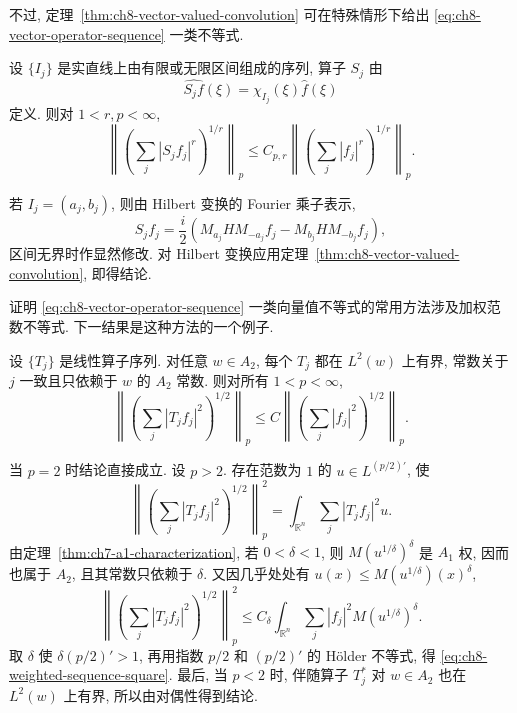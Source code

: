 不过, 定理~\ref{thm:ch8-vector-valued-convolution} 可在特殊情形下给出 \eqref{eq:ch8-vector-operator-sequence} 一类不等式.

\begin{Corollary}
\label{cor:ch8-interval-projections-vector-valued}
设 $\{I_j\}$ 是实直线上由有限或无限区间组成的序列, 算子 $S_j$ 由
\[
 \widehat{S_jf}(\xi)=\chi_{I_j}(\xi)\widehat f(\xi)
\]
定义. 则对 $1<r,p<\infty$,
\[
 \left\|\left(\sum_j|S_jf_j|^r\right)^{1/r}\right\|_p
 \le C_{p,r}\left\|\left(\sum_j|f_j|^r\right)^{1/r}\right\|_p.
\]
\end{Corollary}

\begin{Proof}
若 $I_j=(a_j,b_j)$, 则由 Hilbert 变换的 Fourier 乘子表示,
\[
 S_jf_j=\frac i2\left(M_{a_j}HM_{-a_j}f_j-M_{b_j}HM_{-b_j}f_j\right),
\]
区间无界时作显然修改. 对 Hilbert 变换应用定理~\ref{thm:ch8-vector-valued-convolution}, 即得结论.
\end{Proof}

证明 \eqref{eq:ch8-vector-operator-sequence} 一类向量值不等式的常用方法涉及加权范数不等式. 下一结果是这种方法的一个例子.

\hypertarget{chapter-08-page-171}{}
\begin{Theorem}
\label{thm:ch8-weighted-sequence-square}
设 $\{T_j\}$ 是线性算子序列. 对任意 $w\in A_2$, 每个 $T_j$ 都在 $L^2(w)$ 上有界, 常数关于 $j$ 一致且只依赖于 $w$ 的 $A_2$ 常数. 则对所有 $1<p<\infty$,
\begin{equation}
\label{eq:ch8-weighted-sequence-square}
 \left\|\left(\sum_j|T_jf_j|^2\right)^{1/2}\right\|_p
 \le C\left\|\left(\sum_j|f_j|^2\right)^{1/2}\right\|_p.
\end{equation}
\end{Theorem}

\begin{Proof}
当 $p=2$ 时结论直接成立. 设 $p>2$. 存在范数为 $1$ 的 $u\in L^{(p/2)'}$, 使
\[
 \left\|\left(\sum_j|T_jf_j|^2\right)^{1/2}\right\|_p^2
 =\int_{\mathbb R^n}\sum_j|T_jf_j|^2u.
\]
由定理~\ref{thm:ch7-a1-characterization}, 若 $0<\delta<1$, 则 $M(u^{1/\delta})^\delta$ 是 $A_1$ 权, 因而也属于 $A_2$, 且其常数只依赖于 $\delta$. 又因几乎处处有 $u(x)\le M(u^{1/\delta})(x)^\delta$,
\[
 \left\|\left(\sum_j|T_jf_j|^2\right)^{1/2}\right\|_p^2
 \le C_\delta\int_{\mathbb R^n}\sum_j|f_j|^2M(u^{1/\delta})^\delta.
\]
取 $\delta$ 使 $\delta(p/2)'>1$, 再用指数 $p/2$ 和 $(p/2)'$ 的 Hölder 不等式, 得 \eqref{eq:ch8-weighted-sequence-square}. 最后, 当 $p<2$ 时, 伴随算子 $T_j^*$ 对 $w\in A_2$ 也在 $L^2(w)$ 上有界, 所以由对偶性得到结论.
\end{Proof}
